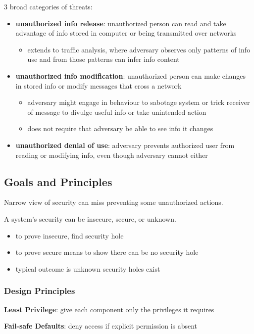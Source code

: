\documentclass[11pt]{article}
\begin{document}
3 broad categories of threats:
\begin{itemize}
\item \textbf{unauthorized info release}: unauthorized person can read and take
advantage of info stored in computer or being transmitted over networks
\begin{itemize}
\item extends to traffic analysis, where adversary observes only patterns
of info use and from those patterns can infer info content
\end{itemize}
\item \textbf{unauthorized info modification}: unauthorized person can make
changes in stored info or modify messages that cross a network
\begin{itemize}
\item adversary might engage in behaviour to sabotage system or trick
receiver of message to divulge useful info or take unintended action
\item does not require that adversary be able to see info it changes
\end{itemize}
\item \textbf{unauthorized denial of use}: adversary prevents authorized user
from reading or modifying info, even though adversary cannot either
\end{itemize}
\subsection{Goals and Principles}
\label{sec:org59ac928}
Narrow view of security can miss preventing some unauthorized actions.

A system's security can be insecure, secure, or unknown.
\begin{itemize}
\item to prove insecure, find security hole
\item to prove secure means to show there can be no security hole
\item typical outcome is unknown security holes exist
\end{itemize}
\subsubsection{Design Principles}
\label{sec:org37c38a5}
\textbf{Least Privilege}: give each component only the privileges it
requires

\textbf{Fail-safe Defaults}: deny access if explicit permission is absent
\end{document}

